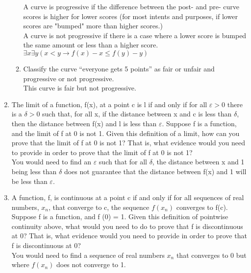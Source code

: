 \documentclass{article}
\begin{document}
\begin{enumerate}
\begin{enumerate}
                        A curve is progressive if the difference between the post- and pre- curve scores is higher for lower scores (for most intents and purposes, if lower scores are "bumped" more than higher scores.)\\
                        A curve is not progressive if there is a case where a lower score is bumped the same amount or less than a higher score. $\exists x \exists y (x < y \to f(x) - x \leq f(y) - y)$
                  \item Classify the curve “everyone gets 5 points” as fair or unfair and progressive or not progressive.\\
                        This curve is fair but not progressive.
            \end{enumerate}
      \item The limit of a function, f(x), at a point c is l if and only if for all $\varepsilon > 0$ there is a $\delta > 0$
            such that, for all x, if the distance between x and c is less than $\delta$, then the distance between
            f(x) and l is less than $\varepsilon$. Suppose f is a function, and the limit of f at 0 is not 1. Given
            this definition of a limit, how can you prove that the limit of f at 0 is not 1? That is, what
            evidence would you need to provide in order to prove that the limit of f at 0 is not 1?\\
            You would need to find an $\varepsilon$ such that for all $\delta$, the distance between x and 1 being less than $\delta$ does not guarantee that the distance between f(x) and 1 will be less than $\varepsilon$.
      \item A function, f, is continuous at a point c if and only if for all sequences of real numbers,
            $x_{n}$, that converge to c, the sequence $f(x_{n})$ converges to f(c). Suppose f is a function, and
            f (0) = 1. Given this definition of pointwise continuity above, what would you need to do
            to prove that f is discontinuous at 0? That is, what evidence would you need to provide in
            order to prove that f is discontinuous at 0?\\
            You would need to find a sequence of real numbers $x_{n}$ that converges to 0 but where $f(x_{n})$ does not converge to 1.
\end{enumerate}
\end{document}
